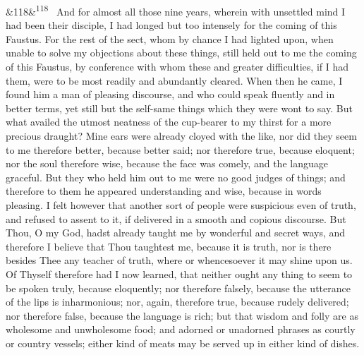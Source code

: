\documentclass[12pt]{article}
\newcommand{\para}[1][]{\par\noindent\ifx&#1&\else\textsuperscript{\footnotesize #1}~\fi}
\begin{document}
\para[118] And for almost all those nine years, wherein with unsettled mind I had been their disciple, I had longed but too intensely for the coming of this Faustus. For the rest of the sect, whom by chance I had lighted upon, when unable to solve my objections about these things, still held out to me the coming of this Faustus, by conference with whom these and greater difficulties, if I had them, were to be most readily and abundantly cleared. When then he came, I found him a man of pleasing discourse, and who could speak fluently and in better terms, yet still but the self-same things which they were wont to say. But what availed the utmost neatness of the cup-bearer to my thirst for a more precious draught? Mine ears were already cloyed with the like, nor did they seem to me therefore better, because better said; nor therefore true, because eloquent; nor the soul therefore wise, because the face was comely, and the language graceful. But they who held him out to me were no good judges of things; and therefore to them he appeared understanding and wise, because in words pleasing. I felt however that another sort of people were suspicious even of truth, and refused to assent to it, if delivered in a smooth and copious discourse. But Thou, O my God, hadst already taught me by wonderful and secret ways, and therefore I believe that Thou taughtest me, because it is truth, nor is there besides Thee any teacher of truth, where or whencesoever it may shine upon us. Of Thyself therefore had I now learned, that neither ought any thing to seem to be spoken truly, because eloquently; nor therefore falsely, because the utterance of the lips is inharmonious; nor, again, therefore true, because rudely delivered; nor therefore false, because the language is rich; but that wisdom and folly are as wholesome and unwholesome food; and adorned or unadorned phrases as courtly or country vessels; either kind of meats may be served up in either kind of dishes.
\end{document}
